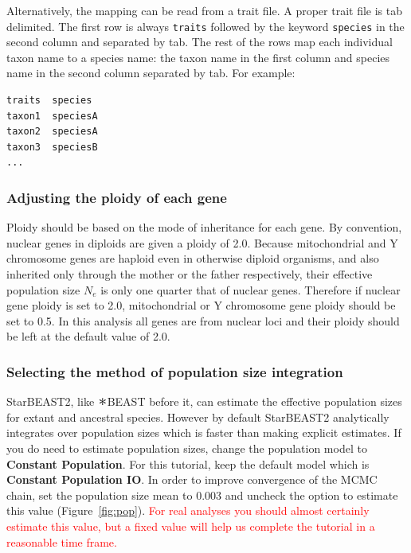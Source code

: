 \documentclass{article}
\newcommand{\Conv}{\mathop{\scalebox{1.5}{$\ast$}}}
\begin{document}
Alternatively, the mapping can be read from a trait file. A proper trait file is
tab delimited. The first row is always \texttt{traits} followed by the keyword
\texttt{species} in the second column and separated by tab. The rest of the rows
map each individual taxon name to a species name: the taxon name in the first
column and species name in the second column separated by tab. For example:

\begin{minipage}[h]{0.7\textwidth}
\begin{verbatim}
traits	species
taxon1	speciesA
taxon2	speciesA
taxon3	speciesB
...
\end{verbatim}
\end{minipage}

\vspace{12pt}

\subsubsection*{Adjusting the ploidy of each gene}

Ploidy should be based on the mode of inheritance for each gene. By convention,
nuclear genes in diploids are given a ploidy of 2.0. Because mitochondrial and Y
chromosome genes are haploid even in otherwise diploid organisms, and also
inherited only through the mother or the father respectively, their effective
population size $N_e$ is only one quarter that of nuclear genes. Therefore if
nuclear gene ploidy is set to 2.0, mitochondrial or Y chromosome gene ploidy
should be set to 0.5. In this analysis all genes are from nuclear loci and their
ploidy should be left at the default value of 2.0.

\clearpage

\subsubsection*{Selecting the method of population size integration}

StarBEAST2, like $\Conv$BEAST before it, can estimate the effective population
sizes for extant and ancestral species. However by default StarBEAST2
analytically integrates over population sizes which is faster than making
explicit estimates. If you do need to estimate population sizes, change the
population model to \textbf{Constant Population}. For this tutorial, keep the
default model which is \textbf{Constant Population IO}. In order to improve
convergence of the MCMC chain, set the population size mean to 0.003 and uncheck
the option to estimate this value (Figure~\ref{fig:pop}). \textcolor{red}{For
real analyses you should almost certainly estimate this value, but a fixed value
will help us complete the tutorial in a reasonable time frame.}
\end{document}
